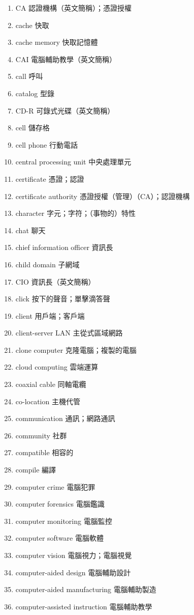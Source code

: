 \begin{enumerate}
  \item CA 認證機構（英文簡稱）；憑證授權
  \item cache 快取
  \item cache memory 快取記憶體
  \item CAI 電腦輔助教學（英文簡稱）
  \item call 呼叫
  \item catalog 型錄
  \item CD-R 可錄式光碟（英文簡稱）
  \item cell 儲存格
  \item cell phone 行動電話
  \item central processing unit 中央處理單元
  \item certificate 憑證；認證
  \item certificate authority 憑證授權（管理）（CA）；認證機構
  \item character 字元；字符；（事物的）特性
  \item chat 聊天
  \item chief information officer 資訊長
  \item child domain 子網域
  \item CIO 資訊長（英文簡稱）
  \item click 按下的聲音；單擊滴答聲
  \item client 用戶端；客戶端
  \item client-server LAN 主從式區域網路
  \item clone computer 克隆電腦；複製的電腦
  \item cloud computing 雲端運算
  \item coaxial cable 同軸電纜
  \item co-location 主機代管
  \item communication 通訊；網路通訊
  \item community 社群
  \item compatible 相容的
  \item compile 編譯
  \item computer crime 電腦犯罪
  \item computer forensics 電腦鑑識
  \item computer monitoring 電腦監控
  \item computer software 電腦軟體
  \item computer vision 電腦視力；電腦視覺
  \item computer-aided design 電腦輔助設計
  \item computer-aided manufacturing 電腦輔助製造
  \item computer-assisted instruction 電腦輔助教學

\end{enumerate}
